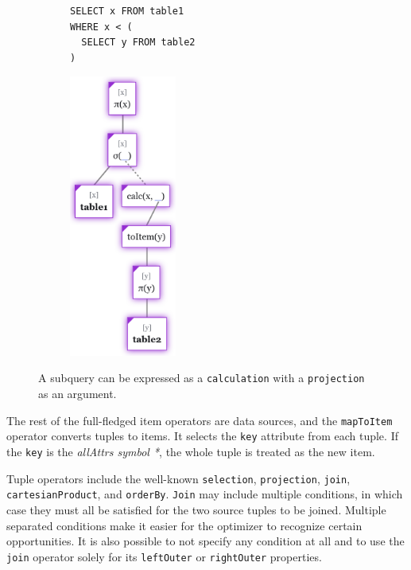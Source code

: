 \begin{figure}[htpb]
    \begin{subfigure}[b]{\textwidth}
    \begin{tcolorbox}[colback=white, colframe=black, boxrule=1pt, arc=0pt]
        \begin{verbatim}
SELECT x FROM table1
WHERE x < (
  SELECT y FROM table2
)
        \end{verbatim}
    \end{tcolorbox}
    \end{subfigure}
    
    \medskip
    
    \begin{subfigure}[b]{\textwidth}
        \centering
        \includegraphics[width=100pt]{img/tree-naive-subquery.png}
    \end{subfigure}
    
    \caption{A subquery can be expressed as a \texttt{calculation} with a \texttt{projection} as an argument.}
    \label{fig:naive-subquery}
\end{figure}

The rest of the full-fledged item operators are data sources, and the \texttt{mapToItem} operator converts tuples to items. It selects the \texttt{key} attribute from each tuple. If the \texttt{key} is the \textit{allAttrs symbol *}, the whole tuple is treated as the new item.

Tuple operators include the well-known \texttt{selection}, \texttt{projection}, \texttt{join}, \\\texttt{cartesianProduct}, and \texttt{orderBy}. \texttt{Join} may include multiple conditions, in which case they must all be satisfied for the two source tuples to be joined. Multiple separated conditions make it easier for the optimizer to recognize certain opportunities. It is also possible to not specify any condition at all and to use the \texttt{join} operator solely for its \texttt{leftOuter} or \texttt{rightOuter} properties.

